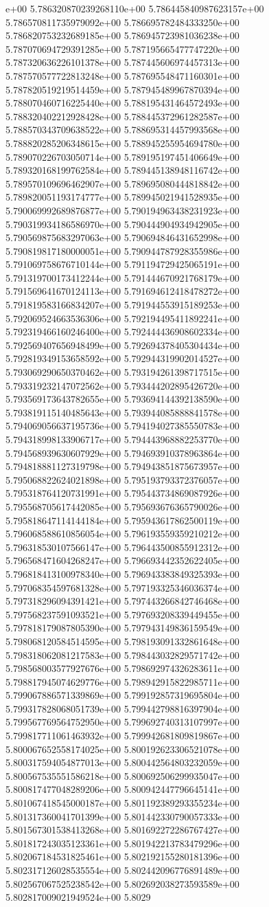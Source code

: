 e+00	5.786320870239268110e+00	5.786445840987623157e+00	5.786570811735979092e+00	5.786695782484333250e+00	5.786820753232689185e+00	5.786945723981036238e+00	5.787070694729391285e+00	5.787195665477747220e+00	5.787320636226101378e+00	5.787445606974457313e+00	5.787570577722813248e+00	5.787695548471160301e+00	5.787820519219514459e+00	5.787945489967870394e+00	5.788070460716225440e+00	5.788195431464572493e+00	5.788320402212928428e+00	5.788445372961282587e+00	5.788570343709638522e+00	5.788695314457993568e+00	5.788820285206348615e+00	5.788945255954694780e+00	5.789070226703050714e+00	5.789195197451406649e+00	5.789320168199762584e+00	5.789445138948116742e+00	5.789570109696462907e+00	5.789695080444818842e+00	5.789820051193174777e+00	5.789945021941528935e+00	5.790069992689876877e+00	5.790194963438231923e+00	5.790319934186586970e+00	5.790444904934942905e+00	5.790569875683297063e+00	5.790694846431652998e+00	5.790819817180000051e+00	5.790944787928355986e+00	5.791069758676710144e+00	5.791194729425065191e+00	5.791319700173412244e+00	5.791444670921768179e+00	5.791569641670124113e+00	5.791694612418478272e+00	5.791819583166834207e+00	5.791944553915189253e+00	5.792069524663536306e+00	5.792194495411892241e+00	5.792319466160246400e+00	5.792444436908602334e+00	5.792569407656948499e+00	5.792694378405304434e+00	5.792819349153658592e+00	5.792944319902014527e+00	5.793069290650370462e+00	5.793194261398717515e+00	5.793319232147072562e+00	5.793444202895426720e+00	5.793569173643782655e+00	5.793694144392138590e+00	5.793819115140485643e+00	5.793944085888841578e+00	5.794069056637195736e+00	5.794194027385550783e+00	5.794318998133906717e+00	5.794443968882253770e+00	5.794568939630607929e+00	5.794693910378963864e+00	5.794818881127319798e+00	5.794943851875673957e+00	5.795068822624021898e+00	5.795193793372376057e+00	5.795318764120731991e+00	5.795443734869087926e+00	5.795568705617442085e+00	5.795693676365790026e+00	5.795818647114144184e+00	5.795943617862500119e+00	5.796068588610856054e+00	5.796193559359210212e+00	5.796318530107566147e+00	5.796443500855912312e+00	5.796568471604268247e+00	5.796693442352622405e+00	5.796818413100978340e+00	5.796943383849325393e+00	5.797068354597681328e+00	5.797193325346036374e+00	5.797318296094391421e+00	5.797443266842746468e+00	5.797568237591093521e+00	5.797693208339449455e+00	5.797818179087805390e+00	5.797943149836159549e+00	5.798068120584514595e+00	5.798193091332861648e+00	5.798318062081217583e+00	5.798443032829571742e+00	5.798568003577927676e+00	5.798692974326283611e+00	5.798817945074629776e+00	5.798942915822985711e+00	5.799067886571339869e+00	5.799192857319695804e+00	5.799317828068051739e+00	5.799442798816397904e+00	5.799567769564752950e+00	5.799692740313107997e+00	5.799817711061463932e+00	5.799942681809819867e+00	5.800067652558174025e+00	5.800192623306521078e+00	5.800317594054877013e+00	5.800442564803232059e+00	5.800567535551586218e+00	5.800692506299935047e+00	5.800817477048289206e+00	5.800942447796645141e+00	5.801067418545000187e+00	5.801192389293355234e+00	5.801317360041701399e+00	5.801442330790057333e+00	5.801567301538413268e+00	5.801692272286767427e+00	5.801817243035123361e+00	5.801942213783479296e+00	5.802067184531825461e+00	5.802192155280181396e+00	5.802317126028535554e+00	5.802442096776891489e+00	5.802567067525238542e+00	5.802692038273593589e+00	5.802817009021949524e+00	5.8029